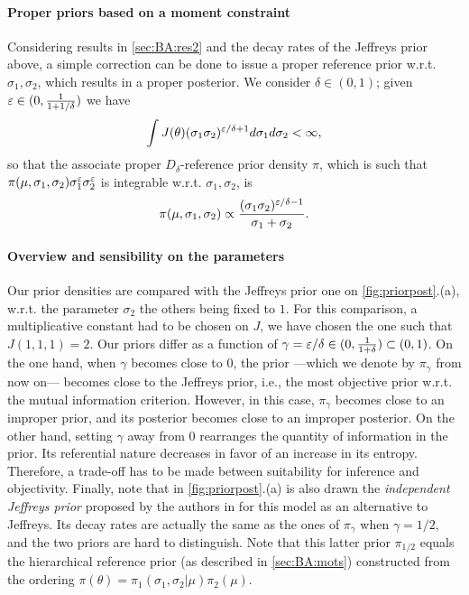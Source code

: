     \paragraph{Proper priors based on a moment constraint}
    Considering results in \cref{sec:BA:res2} and the decay rates of the Jeffreys prior above, a simple correction can be done to issue a proper reference prior w.r.t. $\sigma_1,\sigma_2$, which results in a proper posterior.
    We consider $\delta\in(0,1)$; given $\varepsilon\in(0,\frac{1}{1+1/\delta})$ we have 
        \begin{equation}
            \int J(\theta)(\sigma_1\sigma_2)^{\varepsilon/\delta+1} d\sigma_1d\sigma_2<\infty,
        \end{equation}
    so that the associate proper $D_\delta$-reference prior density $\pi$, which is such that $\pi(\mu,\sigma_1,\sigma_2)\sigma_1^\varepsilon\sigma_2^\varepsilon$ is integrable w.r.t. $\sigma_1,\sigma_2$, is
        \begin{equation}
            \pi(\mu,\sigma_1,\sigma_2) \propto \frac{(\sigma_1\sigma_2)^{\varepsilon/\delta -1}}{\sigma_1+\sigma_2}.        
        \end{equation}


\paragraph{Overview and sensibility on the parameters}
Our prior densities are compared with the Jeffreys prior one on \cref{fig:priorpost}.(a), w.r.t. the parameter $\sigma_2$ the others being fixed to $1$. For this comparison, a multiplicative constant had to be chosen on $J$, we have chosen the one such that $J(1,1,1)=2$.
Our priors differ as a function of $\gamma=\varepsilon/\delta\in(0,\frac{1}{1+\delta})\subset(0,1)$. On the one hand, when $\gamma$ becomes close to $0$, the prior ---which we denote by $\pi_\gamma$ from now on--- becomes close to the Jeffreys prior, i.e., the most objective prior w.r.t. the mutual information criterion. However, in this case, $\pi_\gamma$ becomes close to an improper prior, and its posterior becomes close to an improper posterior. On the other hand, setting $\gamma$ away from $0$ 
rearranges the quantity of information in the prior. Its referential nature decreases in favor of an increase in its entropy.
Therefore, a trade-off has to be made between suitability for inference and objectivity.
Finally, note that in \cref{fig:priorpost}.(a) is also drawn the \emph{independent Jeffreys prior} proposed by the authors in \cite{rubio_inference_2014} for this model as an alternative to Jeffreys. Its decay rates are actually the same as the ones of $\pi_\gamma$ when $\gamma=1/2$, and the two priors are hard to distinguish. Note that this latter prior $\pi_{1/2}$ equals the hierarchical reference prior (as described in  \cref{sec:BA:mots}) constructed from the ordering $\pi(\theta)=\pi_1(\sigma_1,\sigma_2|\mu)\pi_2(\mu)$.




